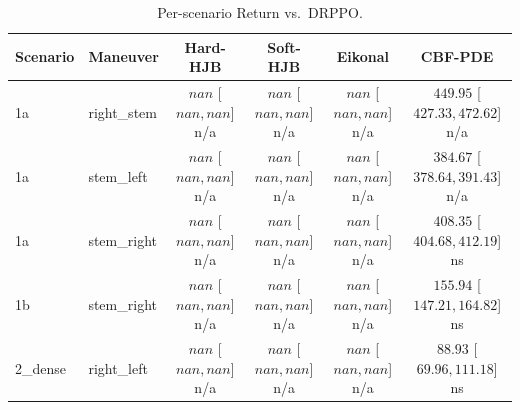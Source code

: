 \begin{table}[ht]
\centering
\caption{Per-scenario Return vs.\ DRPPO.}
\label{tab:per_scenario_mean_return}
\begin{tabular}{llcccc}
\toprule
Scenario & Maneuver & Hard-HJB & Soft-HJB & Eikonal & CBF-PDE \\
\midrule
1a & right_stem & $nan$ [$nan, nan$] n/a & $nan$ [$nan, nan$] n/a & $nan$ [$nan, nan$] n/a & $449.95$ [$427.33, 472.62$] n/a \\
1a & stem_left & $nan$ [$nan, nan$] n/a & $nan$ [$nan, nan$] n/a & $nan$ [$nan, nan$] n/a & $384.67$ [$378.64, 391.43$] n/a \\
1a & stem_right & $nan$ [$nan, nan$] n/a & $nan$ [$nan, nan$] n/a & $nan$ [$nan, nan$] n/a & $408.35$ [$404.68, 412.19$] ns \\
1b & stem_right & $nan$ [$nan, nan$] n/a & $nan$ [$nan, nan$] n/a & $nan$ [$nan, nan$] n/a & $155.94$ [$147.21, 164.82$] ns \\
2_dense & right_left & $nan$ [$nan, nan$] n/a & $nan$ [$nan, nan$] n/a & $nan$ [$nan, nan$] n/a & $88.93$ [$69.96, 111.18$] ns \\
\bottomrule
\end{tabular}
\end{table}
